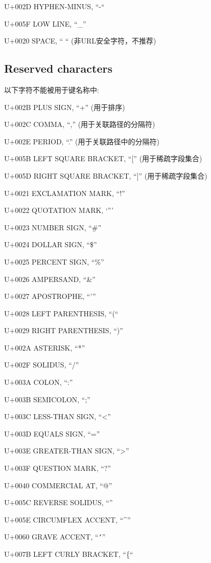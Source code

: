 \begin{compactitem}
\item U+002D HYPHEN-MINUS, “-“
\item U+005F LOW LINE, “\_”
\item U+0020 SPACE, “ “ (非URL安全字符，不推荐)
\end{compactitem}


\subsection{Reserved characters}

以下字符不能被用于键名称中:

\begin{compactitem}
\item U+002B PLUS SIGN, “+” (用于排序)
\item U+002C COMMA, “,” (用于关联路径的分隔符)
\item U+002E PERIOD, “.” (用于关联路径中的分隔符)
\item U+005B LEFT SQUARE BRACKET, “[” (用于稀疏字段集合)
\item U+005D RIGHT SQUARE BRACKET, “]” (用于稀疏字段集合)
\item U+0021 EXCLAMATION MARK, “!”
\item U+0022 QUOTATION MARK, ‘”’
\item U+0023 NUMBER SIGN, “\#”
\item U+0024 DOLLAR SIGN, “\$”
\item U+0025 PERCENT SIGN, “\%”
\item U+0026 AMPERSAND, “\&”
\item U+0027 APOSTROPHE, “’”
\item U+0028 LEFT PARENTHESIS, “(“
\item U+0029 RIGHT PARENTHESIS, “)”
\item U+002A ASTERISK, “*”
\item U+002F SOLIDUS, “/”
\item U+003A COLON, “:”
\item U+003B SEMICOLON, “;”
\item U+003C LESS-THAN SIGN, “<”
\item U+003D EQUALS SIGN, “=”
\item U+003E GREATER-THAN SIGN, “>”
\item U+003F QUESTION MARK, “?”
\item U+0040 COMMERCIAL AT, “@”
\item U+005C REVERSE SOLIDUS, “”
\item U+005E CIRCUMFLEX ACCENT, “\^{}”
\item U+0060 GRAVE ACCENT, “\texttt{`}”
\item U+007B LEFT CURLY BRACKET, “\{“


\end{compactitem}
